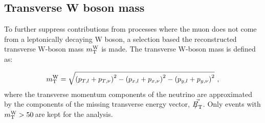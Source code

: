 \subsection{Transverse W boson mass}
To further suppress contributions from processes where the muon does not come from a leptonically decaying W boson, 
a selection based the reconstructed transverse W-boson mass $m_{\mathrm{\rm T}}^{\rm W}$ is made. The transverse W-boson mass is defined as:  

\begin{equation}
  m_{\mathrm{\rm T}}^{\rm W} = \sqrt{\left(p_{T,l} + p_{T,\nu}\right)^2 
    - \left( p_{x,l} + p_{x,\nu} \right)^2 
    - \left(  p_{y,l} + p_{y,\nu} \right)^2}~,
  \label{eqn:mTW}
\end{equation}
where the transverse momentum components of the neutrino are approximated by the components of the missing transverse energy vector, $\vec{{E\!\!\!/}_{\mathrm{T}}}$.
Only events with $m_{\mathrm{\rm T}}^{\rm W} > 50\,$\GeV are kept for the analysis.

